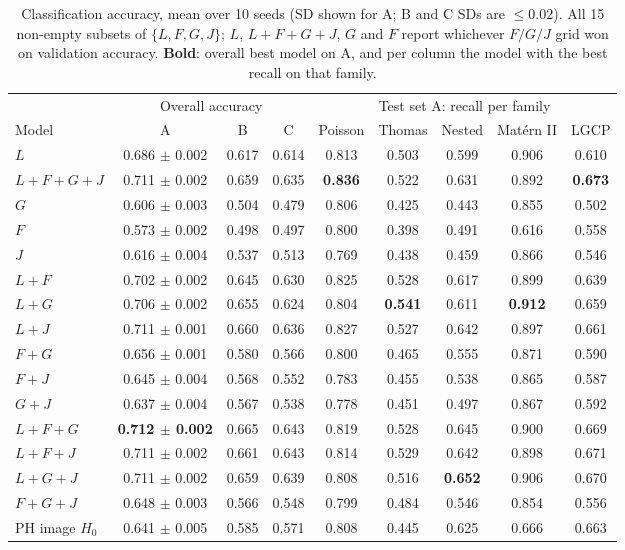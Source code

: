 \documentclass[10pt,a4paper]{article}
\newcommand{\B}[1]{\textbf{#1}}
\begin{document}
\begin{table}[ht]
\centering\footnotesize
\begin{tabular}{@{}l ccc ccccc@{}}
\toprule
 & \multicolumn{3}{c}{Overall accuracy} & \multicolumn{5}{c}{Test set A: recall per family}\\
\cmidrule(lr){2-4}\cmidrule(l){5-9}
Model & A & B & C & Poisson & Thomas & Nested & Mat\'ern II & LGCP\\
\midrule
$L$ & 0.686 $\pm$ 0.002 & 0.617 & 0.614 & 0.813 & 0.503 & 0.599 & 0.906 & 0.610\\
$L{+}F{+}G{+}J$ & 0.711 $\pm$ 0.002 & 0.659 & 0.635 & \B{0.836} & 0.522 & 0.631 & 0.892 & \B{0.673}\\
$G$ & 0.606 $\pm$ 0.003 & 0.504 & 0.479 & 0.806 & 0.425 & 0.443 & 0.855 & 0.502\\
$F$ & 0.573 $\pm$ 0.002 & 0.498 & 0.497 & 0.800 & 0.398 & 0.491 & 0.616 & 0.558\\
$J$ & 0.616 $\pm$ 0.004 & 0.537 & 0.513 & 0.769 & 0.438 & 0.459 & 0.866 & 0.546\\
$L{+}F$ & 0.702 $\pm$ 0.002 & 0.645 & 0.630 & 0.825 & 0.528 & 0.617 & 0.899 & 0.639\\
$L{+}G$ & 0.706 $\pm$ 0.002 & 0.655 & 0.624 & 0.804 & \B{0.541} & 0.611 & \B{0.912} & 0.659\\
$L{+}J$ & 0.711 $\pm$ 0.001 & 0.660 & 0.636 & 0.827 & 0.527 & 0.642 & 0.897 & 0.661\\
$F{+}G$ & 0.656 $\pm$ 0.001 & 0.580 & 0.566 & 0.800 & 0.465 & 0.555 & 0.871 & 0.590\\
$F{+}J$ & 0.645 $\pm$ 0.004 & 0.568 & 0.552 & 0.783 & 0.455 & 0.538 & 0.865 & 0.587\\
$G{+}J$ & 0.637 $\pm$ 0.004 & 0.567 & 0.538 & 0.778 & 0.451 & 0.497 & 0.867 & 0.592\\
\B{$L{+}F{+}G$} & \B{0.712 $\pm$ 0.002} & 0.665 & 0.643 & 0.819 & 0.528 & 0.645 & 0.900 & 0.669\\
$L{+}F{+}J$ & 0.711 $\pm$ 0.002 & 0.661 & 0.643 & 0.814 & 0.529 & 0.642 & 0.898 & 0.671\\
$L{+}G{+}J$ & 0.711 $\pm$ 0.002 & 0.659 & 0.639 & 0.808 & 0.516 & \B{0.652} & 0.906 & 0.670\\
$F{+}G{+}J$ & 0.648 $\pm$ 0.003 & 0.566 & 0.548 & 0.799 & 0.484 & 0.546 & 0.854 & 0.556\\
PH image $H_0$ & 0.641 $\pm$ 0.005 & 0.585 & 0.571 & 0.808 & 0.445 & 0.625 & 0.666 & 0.663\\
\bottomrule
\end{tabular}
\caption{Classification accuracy, mean over 10 seeds (SD shown for A; B and C SDs are $\le 0.02$). All 15 non-empty subsets of $\{L,F,G,J\}$; $L$, $L{+}F{+}G{+}J$, $G$ and $F$ report whichever $F/G/J$ grid won on validation accuracy. \textbf{Bold}: overall best model on A, and per column the model with the best recall on that family.}
\label{tab:classify}
\end{table}
\end{document}

